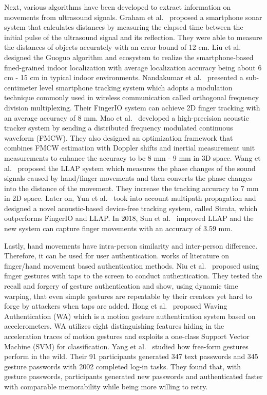 Next, various algorithms have been developed to extract information on movements from ultrasound signals. 
Graham et al.~\cite{graham2015software} proposed a smartphone sonar system that calculates distances by measuring the elapsed time between the initial pulse of the ultrasound signal and its reflection. They were able to measure the distances of objects accurately with an error bound of 12 cm. 
Liu et al.~\cite{liu2015guoguo} designed the Guoguo algorithm and ecosystem to realize the smartphone-based fined-grained indoor localization with average localization accuracy being about 6 cm - 15 cm in typical indoor environments. 
Nandakumar et al.~\cite{nandakumar2016fingerio} presented a sub-centimeter level smartphone tracking system which adopts a modulation technique commonly used in wireless communication called orthogonal frequency division multiplexing. Their FingerIO system can achieve 2D finger tracking with an average accuracy of 8 mm. 
Mao et al.~\cite{mao2016cat} developed a high-precision acoustic tracker system by sending a distributed frequency modulated continuous waveform (FMCW). They also designed an optimization framework that combines FMCW estimation with Doppler shifts and inertial measurement unit measurements to enhance the accuracy to be 8 mm - 9 mm in 3D space. Wang et al.~\cite{wang2016device} proposed the LLAP system which measures the phase changes of the sound signals caused by hand/finger movements and then converts the phase changes into the distance of the movement. They increase the tracking accuracy to 7 mm in 2D space. 
Later on, Yun et al.~\cite{yun2017strata} took into account multipath propagation and designed a novel acoustic-based device-free tracking system, called Strata, which outperforms FingerIO and LLAP. 
In 2018, Sun et al.~\cite{sun2018vskin} improved LLAP and the new system can capture finger movements with an accuracy of 3.59 mm. 

Lastly, hand movements have intra-person similarity and inter-person difference. Therefore, it can be used for user authentication. works of literature on finger/hand movement based authentication methods. 
Niu et al.~\cite{niu2011gesture} proposed using finger gestures with taps to the screen to conduct authentication. They tested the recall and forgery of gesture authentication and show, using dynamic time warping, that even simple gestures are repeatable by their creators yet hard to forge by attackers when taps are added. 
Hong et al.~\cite{hong2015waving} proposed Waving Authentication (WA) which is a motion gesture authentication system based on accelerometers. WA utilizes eight distinguishing features hiding in the acceleration traces of motion gestures and exploits a one-class Support Vector Machine (SVM) for classification. 
Yang et al.~\cite{yang2016free} studied how free-form gestures perform in the wild. Their 91 participants generated 347 text passwords and 345 gesture passwords with 2002 completed log-in tasks. They found that, with gesture passwords, participants generated new passwords and authenticated faster with comparable memorability while being more willing to retry. 

